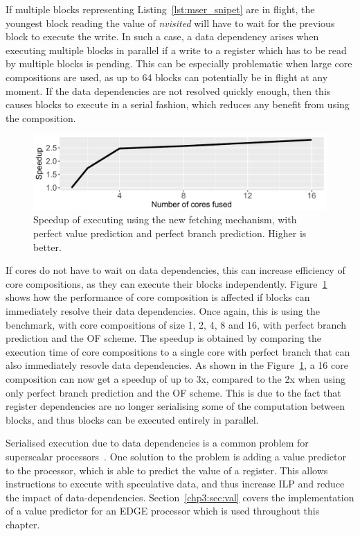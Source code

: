 If multiple blocks representing Listing~\ref{lst:mser_snipet} are in flight, the youngest block reading the value of \textit{nvisited} will have to wait for the previous block to execute the write.
In such a case, a data dependency arises when executing multiple blocks in parallel if a write to a register which has to be read by multiple blocks is pending.
This can be especially problematic when large core compositions are used, as up to 64 blocks can potentially be in flight at any moment.
If the data dependencies are not resolved quickly enough, then this causes blocks to execute in a serial fashion, which reduces any benefit from using the composition.

\begin{figure}[t]
    \centering
    \includegraphics[width=1\textwidth]{chapter3/graphics/mser_motiv_reg.pdf}
    \caption{Speedup of executing  using the new fetching mechanism, with perfect value prediction and perfect branch prediction. Higher is better.}
    \label{fig:motivation_reg}
	\vspace{1em}
\end{figure}

If cores do not have to wait on data dependencies, this can increase efficiency of core compositions, as they can execute their blocks independently.
Figure~\ref{fig:motivation_reg} shows how the performance of core composition is affected if blocks can immediately resolve their data dependencies.
Once again, this is using the  benchmark, with core compositions of size 1, 2, 4, 8 and 16, with perfect branch prediction and the OF scheme.
The speedup is obtained by comparing the execution time of core compositions to a single core with perfect branch that can also immediately resovle data dependencies.
As shown in the Figure~\ref{fig:motivation_reg}, a 16 core composition can now get a speedup of up to 3x, compared to the 2x when using only perfect branch prediction and the OF scheme.
This is due to the fact that register dependencies are no longer serialising some of the computation between blocks, and thus blocks can be executed entirely in parallel.

Serialised execution due to data dependencies is a common problem for superscalar processors~\cite{peraisVTAGE2014}.
One solution to the problem is adding a value predictor to the processor, which is able to predict the value of a register.
This allows instructions to execute with speculative data, and thus increase ILP and reduce the impact of data-dependencies.
Section~\ref{chp3:sec:val} covers the implementation of a value predictor for an EDGE processor which is used throughout this chapter.




